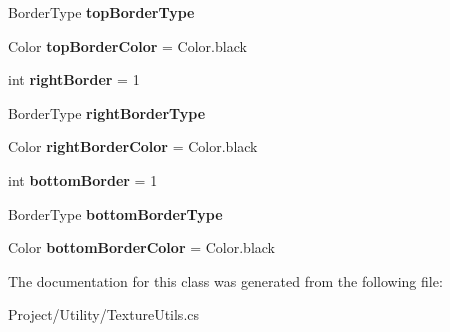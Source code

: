 \begin{DoxyCompactItemize}
Border\+Type {\bfseries top\+Border\+Type}
\item 
\mbox{\label{class_lerp2_a_p_i_1_1_utility_1_1_texture_border_aac01e793a9aefafa7b3eb7cc8d2b7398}} 
Color {\bfseries top\+Border\+Color} = Color.\+black
\item 
\mbox{\label{class_lerp2_a_p_i_1_1_utility_1_1_texture_border_a14900d57129a1ea189b44b0cb179077c}} 
int {\bfseries right\+Border} = 1
\item 
\mbox{\label{class_lerp2_a_p_i_1_1_utility_1_1_texture_border_ae38752a57778a1fa1a49fd5be753f737}} 
Border\+Type {\bfseries right\+Border\+Type}
\item 
\mbox{\label{class_lerp2_a_p_i_1_1_utility_1_1_texture_border_a7f0d46d082c79ead87683a2884d6fe2d}} 
Color {\bfseries right\+Border\+Color} = Color.\+black
\item 
\mbox{\label{class_lerp2_a_p_i_1_1_utility_1_1_texture_border_a7f1cc8ce39a81b8a6cb223932ffe7fc1}} 
int {\bfseries bottom\+Border} = 1
\item 
\mbox{\label{class_lerp2_a_p_i_1_1_utility_1_1_texture_border_a4bc5c94aa9bdcdcc50cecec089383275}} 
Border\+Type {\bfseries bottom\+Border\+Type}
\item 
\mbox{\label{class_lerp2_a_p_i_1_1_utility_1_1_texture_border_a447e083ab13afe805e4a6511c7e1186d}} 
Color {\bfseries bottom\+Border\+Color} = Color.\+black
\end{DoxyCompactItemize}


The documentation for this class was generated from the following file\+:\begin{DoxyCompactItemize}
\item 
Project/\+Utility/Texture\+Utils.\+cs\end{DoxyCompactItemize}
